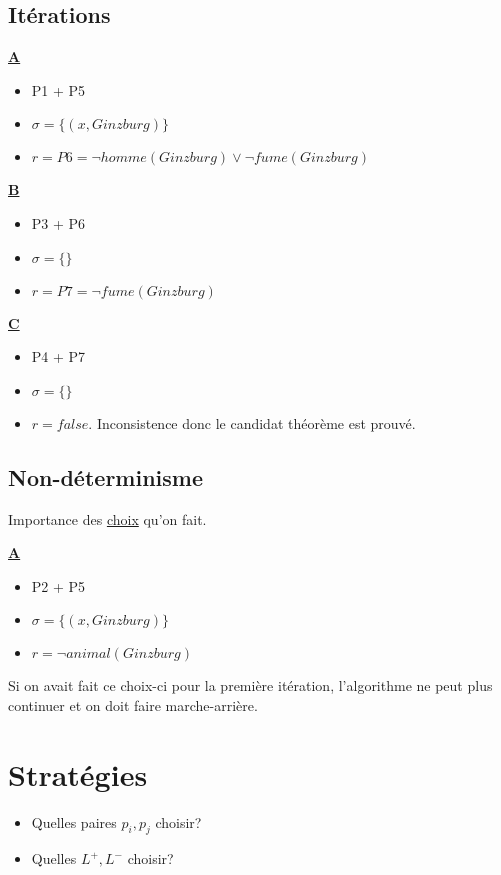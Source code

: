 \subsection{Itérations}

\textbf{\underline{A}}
\begin{itemize}
  \item P1 + P5
  \item $\sigma = \big\{ (x, Ginzburg) \big\}$
  \item $r = P6 = \neg homme(Ginzburg) \vee \neg fume(Ginzburg)$
\end{itemize}

\textbf{\underline{B}}
\begin{itemize}
  \item P3 + P6
  \item $\sigma = \big\{ \big\}$
  \item $r = P7 = \neg fume(Ginzburg)$
\end{itemize}

\textbf{\underline{C}}
\begin{itemize}
  \item P4 + P7
  \item $\sigma = \big\{ \big\}$
  \item $r = false.$ Inconsistence donc le candidat théorème est prouvé.
\end{itemize}

\subsection{Non-déterminisme}

Importance des \underline{choix} qu'on fait.

\textbf{\underline{A}}
\begin{itemize}
  \item P2 + P5
  \item $\sigma = \big\{ (x, Ginzburg) \big\}$
  \item $r = \neg animal(Ginzburg)$
\end{itemize}

Si on avait fait ce choix-ci pour la première itération, l'algorithme ne peut plus continuer et on doit faire marche-arrière.

\section{Stratégies}

\begin{itemize}
  \item Quelles paires $p_i, p_j$ choisir?
  \item Quelles $L^{+}, L^{-}$ choisir?
\end{itemize}

